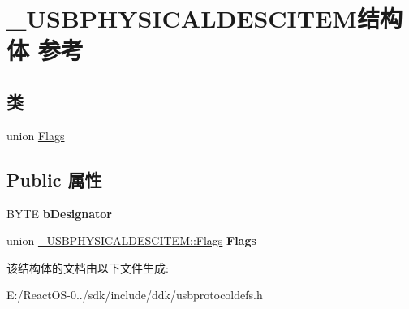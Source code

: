 \hypertarget{struct___u_s_b_p_h_y_s_i_c_a_l_d_e_s_c_i_t_e_m}{}\section{\+\_\+\+U\+S\+B\+P\+H\+Y\+S\+I\+C\+A\+L\+D\+E\+S\+C\+I\+T\+E\+M结构体 参考}
\label{struct___u_s_b_p_h_y_s_i_c_a_l_d_e_s_c_i_t_e_m}
\subsection*{类}
\begin{DoxyCompactItemize}
\item 
union \hyperlink{union___u_s_b_p_h_y_s_i_c_a_l_d_e_s_c_i_t_e_m_1_1_flags}{Flags}
\end{DoxyCompactItemize}
\subsection*{Public 属性}
\begin{DoxyCompactItemize}
\item 
\mbox{\label{struct___u_s_b_p_h_y_s_i_c_a_l_d_e_s_c_i_t_e_m_a8189a2923f4679c827165b194a003164}} 
B\+Y\+TE {\bfseries b\+Designator}
\item 
\mbox{\label{struct___u_s_b_p_h_y_s_i_c_a_l_d_e_s_c_i_t_e_m_a8e53da09bdf94cc04c78680451288610}} 
union \hyperlink{union___u_s_b_p_h_y_s_i_c_a_l_d_e_s_c_i_t_e_m_1_1_flags}{\+\_\+\+U\+S\+B\+P\+H\+Y\+S\+I\+C\+A\+L\+D\+E\+S\+C\+I\+T\+E\+M\+::\+Flags} {\bfseries Flags}
\end{DoxyCompactItemize}


该结构体的文档由以下文件生成\+:\begin{DoxyCompactItemize}
\item 
E\+:/\+React\+O\+S-\/0../sdk/include/ddk/usbprotocoldefs.\+h\end{DoxyCompactItemize}
